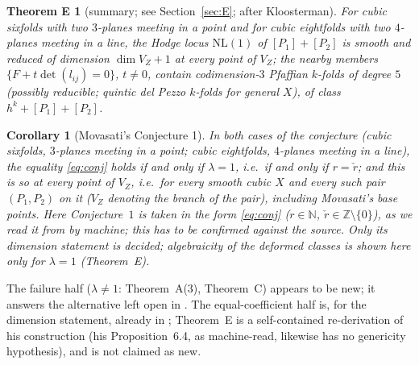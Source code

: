 \documentclass[10pt]{article}
\numberwithin{equation}{section}
\newtheorem*{thmE}{Theorem E}
\newtheorem*{cor*}{Corollary}
\theoremstyle{remark}
\newcommand{\NL}{\mathrm{NL}}
\newcommand{\VZ}{V_Z}
\begin{document}
\begin{thmE}[summary; see Section~\ref{sec:E}; after Kloosterman]
For cubic sixfolds with two $3$-planes meeting in a point and for cubic eightfolds with two $4$-planes meeting
in a line, the Hodge locus $\NL(1)$ of $[P_1]+[P_2]$ is smooth and reduced of dimension $\dim\VZ+1$ at every
point of $\VZ$; the nearby members $\{F+t\det(l_{ij})=0\}$, $t\ne0$, contain codimension-$3$ Pfaffian $k$-folds
of degree $5$ \textup{(}possibly reducible; quintic del Pezzo $k$-folds for general $X$\textup{)}, of class
$h^k+[P_1]+[P_2]$.
\end{thmE}

\begin{cor*}[Movasati's Conjecture 1]
In both cases of the conjecture \textup{(}cubic sixfolds, $3$-planes meeting in a point; cubic eightfolds,
$4$-planes meeting in a line\textup{)}, the equality \eqref{eq:conj} holds if and only if $\lambda=1$, i.e.\ if
and only if $r=\check r$; and this is so at every point of $\VZ$, i.e.\ for every smooth cubic $X$ and every such
pair $(P_1,P_2)$ on it \textup{(}$\VZ$ denoting the branch of the pair\textup{)}, including Movasati's base
points. Here Conjecture~$1$ is taken in the form \eqref{eq:conj} \textup{(}$r\in\mathbb N$,
$\check r\in\mathbb Z\setminus\{0\}$\textup{)}, as we read it from \cite{Mo1} by machine; this has to be confirmed
against the source. Only its dimension statement is decided; algebraicity of the deformed classes is shown here
only for $\lambda=1$ \textup{(}Theorem~E\textup{)}.
\end{cor*}
The failure half ($\lambda\ne1$: Theorem~A(3), Theorem~C) appears to be new; it answers the alternative left
open in \cite{Kl1}. The equal-coefficient half is, for
the dimension statement, already in \cite{Kl1}; Theorem~E is a self-contained re-derivation of his
construction (his Proposition~6.4, as machine-read, likewise has no genericity hypothesis), and is not claimed as
new.
\end{document}
